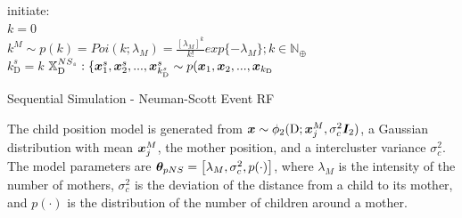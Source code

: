 \begin{algorithm}[H]
\SetAlgoLined
initiate:\\
$k = 0$\\
$k^M \sim p(k) = Poi(k;\lambda_M) = \frac{[\lambda_M]^k}{k!}exp\{-\lambda_M\};k\in\mathbb{N}_\oplus$\\
$k_\textrm{D}^s = k$\;
$\mathbb{X}_\textrm{D}^{NS_s}:\{\bm{x}_1^s,\bm{x}_2^s,...,\bm{x}_{k_\textrm{D}^s}^s \sim p(\bm{x}_1,\bm{x}_2,...,\bm{x}_{k_\textrm{D}}$\;
 \caption{Sequential Simulation - Neuman-Scott Event RF}
 \label{alg:SSNS}
\end{algorithm}

The child position model is generated from $\bm{x} \sim \phi_2(\textrm{D};\bm{x}_j^M, \sigma_c^2\bm{I}_2)$, a Gaussian distribution with mean $\bm{x}_j^M$, the mother position, and a intercluster variance $\sigma_c^2$. The model parameters are $\bm{\theta}_{pNS} = \left[\lambda_M,\sigma_c^2,p(\cdot)\right]$, where $\lambda_M$ is the intensity of the number of mothers, $\sigma_c^2$ is the deviation of the distance from a child to its mother, and $p(\cdot)$ is the distribution of the number of children around a mother.

